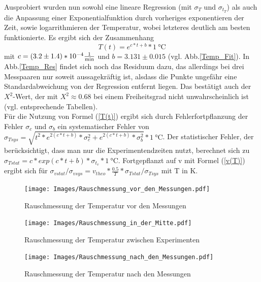 \documentclass[]{article}
\begin{document}
 	Ausprobiert wurden nun sowohl eine lineare Regression (mit $\sigma_T$ und $\sigma_{t_T}$) als auch die Anpassung einer Exponentialfunktion durch vorheriges exponentieren der Zeit, sowie logarrithmieren der Temperatur, wobei letzteres deutlich am besten funktionierte. Es ergibt sich der Zusammenhang
 	\begin{equation}
 	T(t)=e^{c*t+b} *\SI{1}{\celsius}
 	\label{T(t)}
 	\end{equation}
	mit $c=(3.2\pm1.4)*10^{-4}\SI{}{\frac{1}{\minute}}$ und $b=3.131\pm0.015$ (vgl. Abb.\ref{Temp_Fit}).
	In Abb.\ref{Temp_Res} findet sich noch das Residuum dazu, das allerdings bei drei Messpaaren nur soweit aussagekräftig ist, alsdass die Punkte ungefähr eine Standardabweichung von der Regression entfernt liegen. Das bestätigt auch der $X^2$-Wert, der mit $X^2\approx0.68$ bei einem Freiheitsgrad nicht unwahrscheinlich ist (vgl. entsprechende Tabellen).\\
	Für die Nutzung von Formel (\ref{T(t)}) ergibt sich durch Fehlerfortpflanzung der Fehler $\sigma_c$ und $\sigma_b$ ein systematischer Fehler von $\sigma_{Tsys}=\sqrt{t^2*e^{2(c*t+b)}*\sigma_c^2+e^{2(c*t+b)}*\sigma_b^2}*\SI{1}{\celsius}$. Der statistischer Fehler, der berücksichtigt, dass man nur die Experimentendzeiten nutzt, berechnet sich zu $\sigma_{Tstat}=c*exp{(c*t+b)}*\sigma_{t_v}*\SI{1}{\celsius}$. Fortgepflanzt auf v mit Formel (\ref{v(T)}) ergibt sich für $\sigma_{vstat}/\sigma_{vsys}=v_{theo}*\frac{0.5}{T}*\sigma_{Tstat}/\sigma_{Tsys}$ mit T in K.\\
	
	\begin{figure}
	\begin{center}
		\texttt{[image: Images/Rauschmessung\_vor\_den\_Messungen.pdf]}
		\caption{Rauschmessung der Temperatur vor den Messungen}
		\label{Temp_vorn}
	\end{center}
	\end{figure}	

	\begin{figure}
	\begin{center}
		\texttt{[image: Images/Rauschmessung\_in\_der\_Mitte.pdf]}
		\caption{Rauschmessung der Temperatur zwischen Experimenten}
		\label{Temp_mitte}
	\end{center}
	\end{figure}

	\begin{figure}
	\begin{center}
		\texttt{[image: Images/Rauschmessung\_nach\_den\_Messungen.pdf]}
		\caption{Rauschmessung der Temperatur nach den Messungen}
		\label{Temp_hinten}
	\end{center}
	\end{figure}
\end{document}
